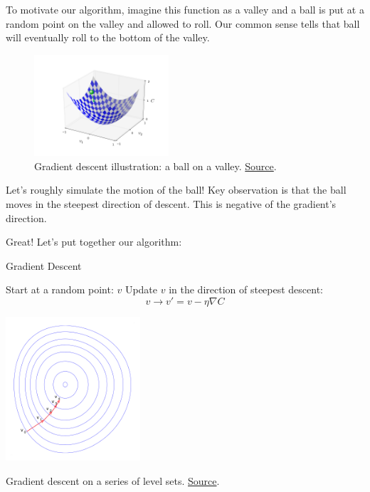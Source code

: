 \documentclass[a4paper]{tufte-handout}
\begin{document}
To motivate our algorithm, imagine this function as a valley and a ball
is put at a random point on the valley and allowed to roll. Our common
sense tells that ball will eventually roll to the bottom of the valley.

\begin{figure}
  \includegraphics[width=50mm]{valley_with_ball}
  \caption{Gradient descent illustration: a ball on a valley.
\href{http://neuralnetworksanddeeplearning.com/chap1.html}{Source}.}
\end{figure}

Let's roughly simulate the motion of the ball! Key observation is that
the ball moves in the steepest direction of descent. This is negative
of the gradient's direction.

Great! Let's put together our algorithm:

\begin{algorithm}
\caption{Gradient Descent}
\begin{algorithmic}[1]
  \STATE Start at a random point: \(v\)
  \STATE Update \(v\) in the direction of steepest descent: 
      \[v \rightarrow v' = v -\eta \nabla C\]
  \ENDWHILE
\end{algorithmic}
\end{algorithm}

\begin{marginfigure}[-40mm]
  \includegraphics[width=50mm]{Gradient_descent}
  \caption{Gradient descent on a series of level sets.
  \href{https://en.wikipedia.org/wiki/Gradient_descent}{Source}.}
\end{marginfigure}
\end{document}
